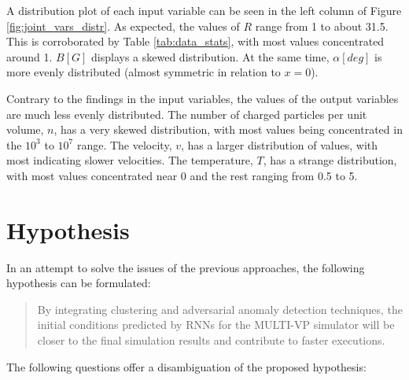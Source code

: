 A distribution plot of each input variable can be seen in the left column of Figure \ref{fig:joint_vars_distr}. As expected, the values of $R$ range from 1 to about 31.5. This is corroborated by Table \ref{tab:data_stats}, with most values concentrated around 1. $B [G]$ displays a skewed distribution. At the same time, $\alpha [deg]$ is more evenly distributed (almost symmetric in relation to $x=0$).

Contrary to the findings in the input variables, the values of the output variables are much less evenly distributed. The number of charged particles per unit volume, $n$, has a very skewed distribution, with most values being concentrated in the $10^{3}$ to $10^{7}$ range. The velocity, $v$, has a larger distribution of values, with most indicating slower velocities. The temperature, $T$, has a strange distribution, with most values concentrated near 0 and the rest ranging from 0.5 to 5.

\section{Hypothesis}\label{sec:hypothesis}
In an attempt to solve the issues of the previous approaches, the following hypothesis can be formulated:
\begin{quote}
    By integrating clustering and adversarial anomaly detection techniques, the initial conditions predicted by RNNs for the MULTI-VP simulator will be closer to the final simulation results and contribute to faster executions.
    
\end{quote}

The following questions offer a disambiguation of the proposed hypothesis:

